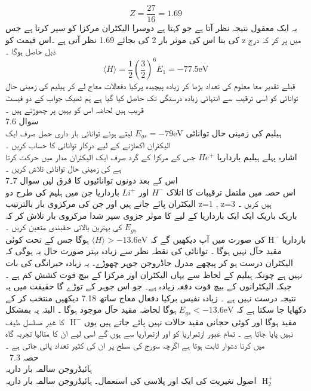 \documentclass{book}
\begin{document}
\[Z=\frac{27}{16}=1.69\]
یہ ایک معقول نتیجہ نظر آتا ہے جو کہتا ہے دوسرا الیکٹران مرکزا کو سپر کرتا ہے جس کی بنا اس کی موثر بار 2 کی بجائے 1.69 نظر آتی ہے ۔اس قیمت کو z میں پر کر کہ درج ذیل حاصل ہوگا ۔\\
\[\langle H \rangle =\frac{1}{2}(\frac{3}{2})^{6}E_{1}=-77.5\text{eV}\]
قبلے تقدیر معا معلوم کی تعداد بڑھا کر زیادہ پیچیدہ پرکیا دفعالات معاج لے کر ہیلیم کی زمینی حال توانائی کو اسی ترقیب سے انتہائی زیادہ درستگی تک حاصل کیا گیا ہے ہم ٹھیک جواب کے دو فیسٹ قریب ہیں لحاضہ اس کو یہیں پر چھوڑتے ہیں ۔\\
سوال  
7.6\\
ہیلیم کی زمینی حال توانائی 
\(E_{gs}=-79\text{eV}\)
 لیتے ہوئے توانائی بار داری حمل صرف ایک الیکٹران اکھاڑنے کے لیے درکار توانائی کا حساب کریں ۔\\
اشارہ پہلے ہیلیم بارداریا
 \(He^{+}\)
 جس کے مرکزا کے گرد صرف ایک الیکٹران مدار میں حرکت کرتا ہے کی زمینی حال توانائی تلاش کریں ۔\\
اس کے بعد دونوں توانائیوں کا فرق لیں 
سوال 7۔7
\\
اس حصہ میں ملتمل ترقیبات کا اتلاک
 \(H^{-}\)
 اور
  \(Li^{+}\)
  بارداریا جن میں ہلیم کی طرح دو الیکٹران پائے جاتے ہیں اور جن کی مرکزوی بار بالترتیب z=1 , z=3 ہیں کریں ۔\\
باریک باریک ایک ایک بارداریا کے لیے کا موثر جزوی سپر شدا مرکزوی بار تلاش کر کہ 
\(E_{gs}\)
 کی بہترین بالائی حقبندی متعین کریں ۔\\
 بارداریا
 \(\text{H}^{-}\)
  کی صورت میں آپ دیکھیں گے کہ 
  \(\langle  H \rangle  > -13.6\text{eV}\) 
  ہوگا جس کے تحت کوئی مقید حآل نہیں ہوگا ۔
توانائی کی نقطہ نظر سے زیادہ بہتر صورت حال یہ ہوگی کہ الیکٹران درست ہو کر پیچھے مدرل حاڈروجن جوہر چھوڑے۔ یہ زیادہ حیرانگی کی بات نہیں ہے چونکہ ہیلیم کے لحاظ سے یہاں الیکٹران اور مرکزا کے بیچ قوت کشش کم ہے ۔ جبکہ الیکٹرانوں کے بیچ قوت دفعہ زیادہ ہے۔
جو اس جوہر کے توڑے گا حقیقت میں یہ نتیجہ درست نہیں ہے ۔ زیادہ نفیس برکیا دفعال معاج ساتھ 
7.18
دیکھیں 
منتخب کر کے دکھایا جا سکتا ہے کہ 
\(E_{gs}<-13.6\text{eV}\)
ہوگا لحاضہ مقید حآل موجود ہوگا ۔
البتہ یہ بمشکل مقید ہوگا اور کوئی حجانی مقید حالات نہیں پائے جاتے ہیں یوں
\(\text{ H}^{-}\)
 کا غیر مسلسل طیف نہیں پایا جاتا ہے ۔
تمام عبور ازتمراریا کو اور ازتمراریا سے ہوں گے اسی لیے ان کا متالیا تجربہ گاہ میں کرنا دشوار ثابت ہوتا ہے اگرچہ سورج کی سطح پر ان کی کثیر تعداد پائی جاتی ہے ۔\\
\
حصہ 
7.3\\
ہائیڈروجن سالمہ بار داریہ \\
اصول تغیریت کی ایک اور پلاسی کی استعمال۔ ہائیڈروجن سالمہ بار داریہ
\(\text{ H}_{2}^{+}\)
\end{document}
